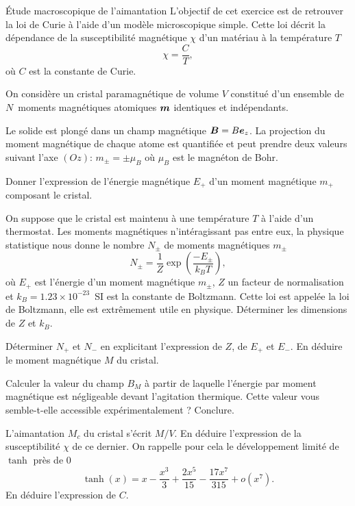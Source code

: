 \begin{td}{Étude macroscopique de l'aimantation}
	L'objectif de cet exercice est de retrouver la loi de Curie à l'aide
	d'un modèle microscopique simple. Cette loi décrit
	la dépendance de la susceptibilité magnétique $\chi$ d'un matériau à la température
	$T$
	\begin{equation*}
		\chi = \dfrac{C}{T},
	\end{equation*}
	où $C$ est la constante de Curie.

	On considère un cristal paramagnétique de volume $V$ constitué d'un ensemble
	de $N$~moments magnétiques atomiques $\vecm$ identiques et indépendants. 

	Le solide est plongé dans un champ magnétique $\vecb = B \ez$. La projection
	du moment magnétique de chaque atome est quantifiée et peut prendre deux
	valeurs suivant l'axe $(Oz)$: $m_\pm = \pm \mu_B$ où $\mu_B$ est le magnéton de
	Bohr.
	\begin{exlist}
		\item Donner l'expression de l'énergie magnétique $E_+$ d'un moment
		  magnétique $m_+$ composant le cristal. 	
	  	\item On suppose que le cristal est maintenu à une température
		  $T$ à l'aide d'un thermostat. Les moments magnétiques 
		  n'intéragissant pas entre eux, la physique statistique
		  nous donne le nombre $N_\pm$ de moments magnétiques $m_\pm$
		  \begin{equation*}
			  N_\pm = \dfrac{1}{Z} \exp\left(\dfrac{-E_\pm}{k_B T}\right),
		  \end{equation*}
		  où $E_+$ est l'énergie d'un moment magnétique $m_\pm$,
		  $Z$ un facteur de normalisation et 
		  $k_B = 1.23 \times 10^{-23}$\, SI est la constante de Boltzmann.
		  Cette loi est appelée la loi de Boltzmann, elle est 
		  extrêmement utile en physique.
		  Déterminer les dimensions de $Z$ et $k_B$.
		
	  \item Déterminer $N_+$ et $N_-$ en explicitant l'expression de 
	    $Z$, de $E_+$ et $E_-$. En déduire le moment magnétique $M$ 
	    du cristal.
	  \item Calculer la valeur du champ $B_M$ à partir de laquelle l'énergie 
	    par moment magnétique est négligeable devant l'agitation thermique.
	    Cette valeur vous semble-t-elle accessible expérimentalement ?
	    Conclure.
	  \item L'aimantation $M_c$ du cristal s'écrit $M/V$. En déduire l'expression
	    de la susceptibilité $\chi$ de ce dernier.
	    On rappelle pour cela le développement
	    limité de $\tanh$ près de $0$
	    \begin{equation*}
		    \tanh(x) = x -\dfrac{x^3}{3} + \dfrac{2x^5}{15} - 
		    \dfrac{17x^7}{315}+ o(x^7).
	    \end{equation*}
	    En déduire l'expression de $C$.


\end{exlist}
\end{td}
